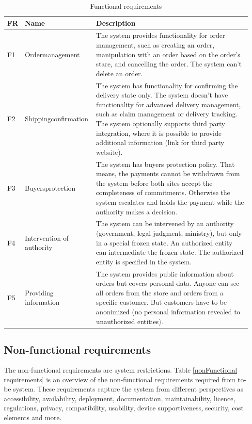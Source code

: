 \documentclass[thesis=M,english]{FITthesis}[2019/12/23]
\begin{document}
\begin{table}[ht! ]
\caption{Functional requirements} \label{functional requirements}
\begin{tabular}{| p{0.5cm} | p{2.5cm} | p{9cm} | }
\toprule
FR &
  Name &
  Description \\ \midrule
F1 &
  Order\break management &
  The system provides functionality for order management, such as creating an order, manipulation with an order based on the order's stare, and cancelling the order. The system can't delete an order. \\\hline
F2 &
  Shipping\break confirmation &
  The system has functionality for confirming the delivery state only. The system doesn't have functionality for advanced delivery management, such as claim management or delivery tracking. The system optionally supports third party integration, where it is possible to provide additional information (link for third party website).  \\\hline
F3 &
  Buyers\break protection &
  The system has buyers protection policy. That means, the payments cannot be withdrawn from the system before both sites accept the completeness of commitments. Otherwise the system escalates and holds the payment while the authority makes a decision.  \\\hline
F4 &
  Intervention of authority &
  The system can be intervened by an authority (government, legal judgment, ministry), but only in a special frozen state. An authorized entity can intermediate the frozen state. The authorized entity is specified in the system. \\\hline
F5 &
  Providing information &
  The system provides public information about orders but covers personal data. Anyone can see all orders from the store and orders from a specific customer. But customers have to be anonimized (no personal information revealed to unauthorized entities).  \\\hline
\end{tabular}
\end{table}



\subsection{Non-functional requirements}

The non-functional requirements are system restrictions. Table \ref{nonFunctional requirements} is an overview of the non-functional requirements required from to-be system. These requirements capture the system from different perspectives as accessibility, availability, deployment, documentation, maintainability, licence, regulations, privacy, compatibility, usability, device supportiveness, security, cost elements and more. 
\end{document}
